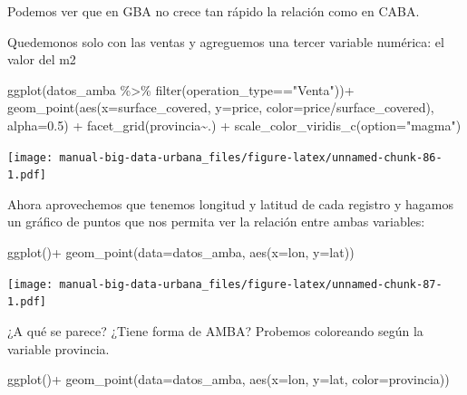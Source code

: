 \documentclass[
  spanish,
]{book}
\newenvironment{Shaded}{\begin{snugshade}}{\end{snugshade}}
\newcommand{\AttributeTok}[1]{\textcolor[rgb]{0.77,0.63,0.00}{#1}}
\newcommand{\FloatTok}[1]{\textcolor[rgb]{0.00,0.00,0.81}{#1}}
\newcommand{\FunctionTok}[1]{\textcolor[rgb]{0.00,0.00,0.00}{#1}}
\newcommand{\NormalTok}[1]{#1}
\newcommand{\SpecialCharTok}[1]{\textcolor[rgb]{0.00,0.00,0.00}{#1}}
\newcommand{\StringTok}[1]{\textcolor[rgb]{0.31,0.60,0.02}{#1}}
\begin{document}
Podemos ver que en GBA no crece tan rápido la relación como en CABA.

Quedemonos solo con las ventas y agreguemos una tercer variable numérica: el valor del m2

\begin{Shaded}
\begin{Highlighting}[]
\FunctionTok{ggplot}\NormalTok{(datos\_amba }\SpecialCharTok{\%\textgreater{}\%}
         \FunctionTok{filter}\NormalTok{(operation\_type}\SpecialCharTok{==}\StringTok{"Venta"}\NormalTok{))}\SpecialCharTok{+}
  \FunctionTok{geom\_point}\NormalTok{(}\FunctionTok{aes}\NormalTok{(}\AttributeTok{x=}\NormalTok{surface\_covered, }\AttributeTok{y=}\NormalTok{price, }\AttributeTok{color=}\NormalTok{price}\SpecialCharTok{/}\NormalTok{surface\_covered), }\AttributeTok{alpha=}\FloatTok{0.5}\NormalTok{) }\SpecialCharTok{+}
  \FunctionTok{facet\_grid}\NormalTok{(provincia}\SpecialCharTok{\textasciitilde{}}\NormalTok{.) }\SpecialCharTok{+}
  \FunctionTok{scale\_color\_viridis\_c}\NormalTok{(}\AttributeTok{option=}\StringTok{"magma"}\NormalTok{)}
\end{Highlighting}
\end{Shaded}

\texttt{[image: manual-big-data-urbana\_files/figure-latex/unnamed-chunk-86-1.pdf]}

Ahora aprovechemos que tenemos longitud y latitud de cada registro y hagamos un gráfico de puntos que nos permita ver la relación entre ambas variables:

\begin{Shaded}
\begin{Highlighting}[]
\FunctionTok{ggplot}\NormalTok{()}\SpecialCharTok{+}
  \FunctionTok{geom\_point}\NormalTok{(}\AttributeTok{data=}\NormalTok{datos\_amba, }\FunctionTok{aes}\NormalTok{(}\AttributeTok{x=}\NormalTok{lon, }\AttributeTok{y=}\NormalTok{lat))}
\end{Highlighting}
\end{Shaded}

\texttt{[image: manual-big-data-urbana\_files/figure-latex/unnamed-chunk-87-1.pdf]}

¿A qué se parece? ¿Tiene forma de AMBA? Probemos coloreando según la variable provincia.

\begin{Shaded}
\begin{Highlighting}[]
\FunctionTok{ggplot}\NormalTok{()}\SpecialCharTok{+}
  \FunctionTok{geom\_point}\NormalTok{(}\AttributeTok{data=}\NormalTok{datos\_amba, }\FunctionTok{aes}\NormalTok{(}\AttributeTok{x=}\NormalTok{lon, }\AttributeTok{y=}\NormalTok{lat, }\AttributeTok{color=}\NormalTok{provincia))}
\end{Highlighting}
\end{Shaded}
\end{document}
